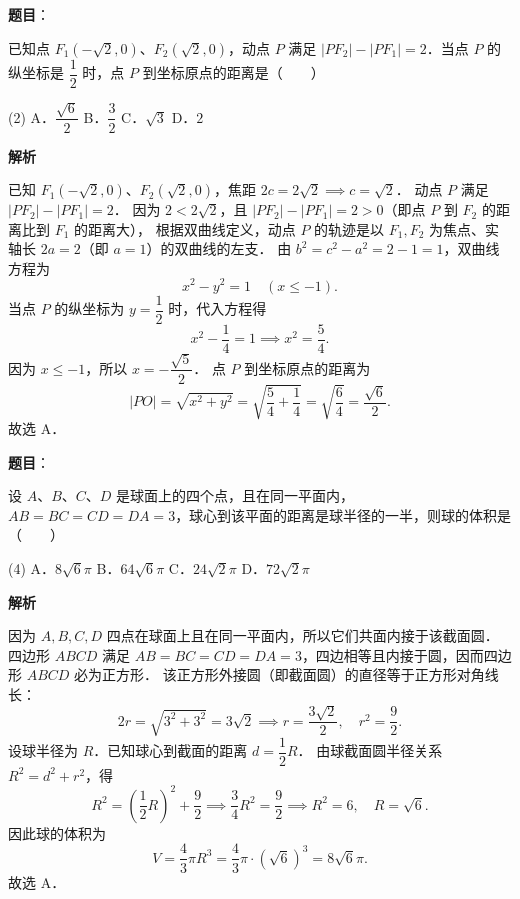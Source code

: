 \begin{answer}

\textbf{题目}：

已知点 $F_1(-\sqrt{2}, 0)$、$F_2(\sqrt{2}, 0)$，动点 $P$ 满足 $|PF_2| - |PF_1| = 2$．当点 $P$ 的纵坐标是 $\dfrac{1}{2}$ 时，点 $P$ 到坐标原点的距离是\mbox{（　　）}

\begin{gkopts}(2)
\task A．$\dfrac{\sqrt{6}}{2}$
\task B．$\dfrac{3}{2}$
\task C．$\sqrt{3}$
\task D．$2$
\end{gkopts}

\textbf{解析}

已知 $F_1(-\sqrt{2}, 0)$、$F_2(\sqrt{2}, 0)$，焦距 $2c = 2\sqrt{2} \implies c = \sqrt{2}$．
动点 $P$ 满足 $|PF_2| - |PF_1| = 2$．
因为 $2 < 2\sqrt{2}$，且 $|PF_2| - |PF_1| = 2 > 0$（即点 $P$ 到 $F_2$ 的距离比到 $F_1$ 的距离大），
根据双曲线定义，动点 $P$ 的轨迹是以 $F_1, F_2$ 为焦点、实轴长 $2a = 2$（即 $a = 1$）的双曲线的左支．
由 $b^2 = c^2 - a^2 = 2 - 1 = 1$，双曲线方程为
\nopagebreak[4]
\[
x^2 - y^2 = 1 \quad (x \leqslant -1).
\]
当点 $P$ 的纵坐标为 $y = \dfrac{1}{2}$ 时，代入方程得
\nopagebreak[4]
\[
x^2 - \frac{1}{4} = 1 \implies x^2 = \frac{5}{4}.
\]
因为 $x \leqslant -1$，所以 $x = -\dfrac{\sqrt{5}}{2}$．
点 $P$ 到坐标原点的距离为
\nopagebreak[4]
\[
|PO| = \sqrt{x^2 + y^2} = \sqrt{\frac{5}{4} + \frac{1}{4}} = \sqrt{\frac{6}{4}} = \frac{\sqrt{6}}{2}.
\]
故选 A．


\end{answer}
\begin{answer}

\textbf{题目}：

设 $A$、$B$、$C$、$D$ 是球面上的四个点，且在同一平面内，$AB = BC = CD = DA = 3$，球心到该平面的距离是球半径的一半，则球的体积是\mbox{（　　）}

\begin{gkopts}(4)
\task A．$8\sqrt{6}\pi$
\task B．$64\sqrt{6}\pi$
\task C．$24\sqrt{2}\pi$
\task D．$72\sqrt{2}\pi$
\end{gkopts}

\textbf{解析}

因为 $A, B, C, D$ 四点在球面上且在同一平面内，所以它们共面内接于该截面圆．
四边形 $ABCD$ 满足 $AB = BC = CD = DA = 3$，四边相等且内接于圆，因而四边形 $ABCD$ 必为正方形．
该正方形外接圆（即截面圆）的直径等于正方形对角线长：
\nopagebreak[4]
\[
2r = \sqrt{3^2 + 3^2} = 3\sqrt{2} \implies r = \frac{3\sqrt{2}}{2}, \quad r^2 = \frac{9}{2}.
\]
设球半径为 $R$．已知球心到截面的距离 $d = \dfrac{1}{2}R$．
由球截面圆半径关系 $R^2 = d^2 + r^2$，得
\nopagebreak[4]
\[
R^2 = \left(\frac{1}{2}R\right)^2 + \frac{9}{2} \implies \frac{3}{4}R^2 = \frac{9}{2} \implies R^2 = 6, \quad R = \sqrt{6}.
\]
因此球的体积为
\nopagebreak[4]
\[
V = \frac{4}{3}\pi R^3 = \frac{4}{3}\pi \cdot (\sqrt{6})^3 = 8\sqrt{6}\pi.
\]
故选 A．


\end{answer}
